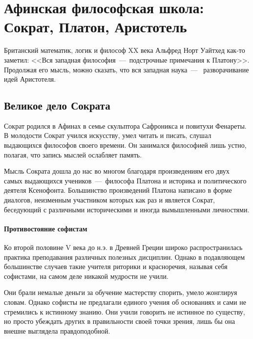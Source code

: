 \section{Афинская философская школа: Сократ, Платон, Аристотель}

Британский математик, логик и философ XX века Альфред Норт Уайтхед как-то заметил: <<Вся западная философия~---~подстрочные примечания к Платону>>. 
Продолжая его мысль, можно сказать, что вся западная наука~---~ разворачивание идей Аристотеля.

\subsection{Великое дело Сократа}

Сократ родился в Афинах в семье скульптора Сафроникса и повитухи Фенареты. В молодости Сократ учился искусству, умел читать и писать, слушал выдающихся философов своего времени. Он занимался философией лишь устно, полагая, что запись мыслей ослабляет память. 

Мысль Сократа дошла до нас во многом благодаря произведениям его двух самых выдающихся учеников~---~философа Платона и историка и политического деятеля Ксенофонта. Большинство произведений Платона написано в форме диалогов, неизменным участником которых как раз и является Сократ, беседующий с различными историческими и иногда вымышленными личностями. 


\paragraph{Противостояние софистам}
Ко второй половине V века до н.э. в Древней Греции широко распространилась практика преподавания различных полезных дисциплин. Однако в подавляющем большинстве случаев такие учителя риторики и красноречия, называя себя софистами, на самом деле никакой мудрости не учили. 

Они брали немалые деньги за обучение мастерству спорить, умело жонглируя словам. Однако софисты не предлагали единого учения об основаниях и сами не стремились к истинному знанию. Они учили говорить не истинное по существу, но просто убеждать других в правильности своей точки зрения, лишь бы она внешне выглядела правдоподобной. 


